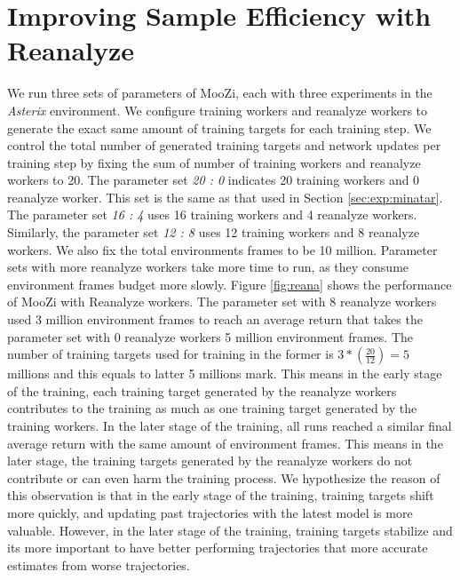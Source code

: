 \section{Improving Sample Efficiency with Reanalyze} \label{sec:exp:re}
We run three sets of parameters of MooZi, each with three experiments in the \textit{Asterix} environment.
We configure training workers and reanalyze workers to generate the exact same amount of training targets for each training step.
We control the total number of generated training targets and network updates per training step by fixing the sum of number of training workers and reanalyze workers to 20.
The parameter set \textit{20 : 0} indicates 20 training workers and 0 reanalyze worker.
This set is the same as that used in Section \ref{sec:exp:minatar}.
The parameter set \textit{16 : 4} uses 16 training workers and 4 reanalyze workers.
Similarly, the parameter set \textit{12 : 8} uses 12 training workers and 8 reanalyze workers.
We also fix the total environments frames to be 10 million.
Parameter sets with more reanalyze workers take more time to run, as they consume environment frames budget more slowly.
Figure \ref{fig:reana} shows the performance of MooZi with Reanalyze workers.
The parameter set with 8 reanalyze workers used 3 million environment frames to reach an average return that takes the parameter set with 0 reanalyze workers 5 million environment frames.
The number of training targets used for training in the former is $3 * (\frac{20}{12}) = 5$ millions and this equals to latter 5 millions mark.
This means in the early stage of the training, each training target generated by the reanalyze workers contributes to the training as much as one training target generated by the training workers.
In the later stage of the training, all runs reached a similar final average return with the same amount of environment frames.
This means in the later stage, the training targets generated by the reanalyze workers do not contribute or can even harm the training process.
We hypothesize the reason of this observation is that in the early stage of the training, training targets shift more quickly, and updating past trajectories with the latest model is more valuable.
However, in the later stage of the training, training targets stabilize and its more important to have better performing trajectories that more accurate estimates from worse trajectories.



